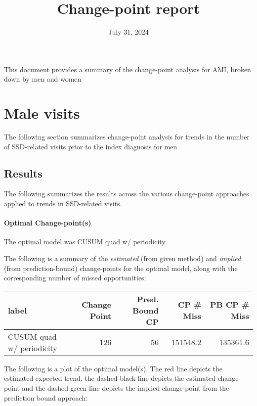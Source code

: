 \documentclass[
]{article}
\title{Change-point report}
\author{}
\date{\vspace{-2.5em}July 31, 2024}
\begin{document}
\maketitle

This document provides a summary of the change-point analysis for AMI,
broken down by men and women

\hypertarget{male-visits}{%
\section{Male visits}\label{male-visits}}

The following section summarizes change-point analysis for trends in the
number of SSD-related visits prior to the index diagnosis for men

\hypertarget{results}{%
\subsection{Results}\label{results}}

The following summarizes the results across the various change-point
approaches applied to trends in SSD-related visits.

\hypertarget{optimal-change-points}{%
\paragraph{Optimal Change-point(s)}\label{optimal-change-points}}

The optimal model was CUSUM quad w/ periodicity

The following is a summary of the \emph{estimated} (from given method)
and \emph{implied} (from prediction-bound) change-points for the optimal
model, along with the corresponding number of missed opportunities:

\begin{table}
\centering
\begin{tabular}{l|r|r|r|r}
\hline
label & Change Point & Pred. Bound CP & CP \# Miss & PB CP \# Miss\\
\hline
CUSUM quad w/ periodicity & 126 & 56 & 151548.2 & 135361.6\\
\hline
\end{tabular}
\end{table}

The following is a plot of the optimal model(s). The red line depicts
the estimated expected trend, the dashed-black line depicts the
estimated change-point and the dashed-green line depicts the implied
change-point from the prediction bound approach:
\end{document}
